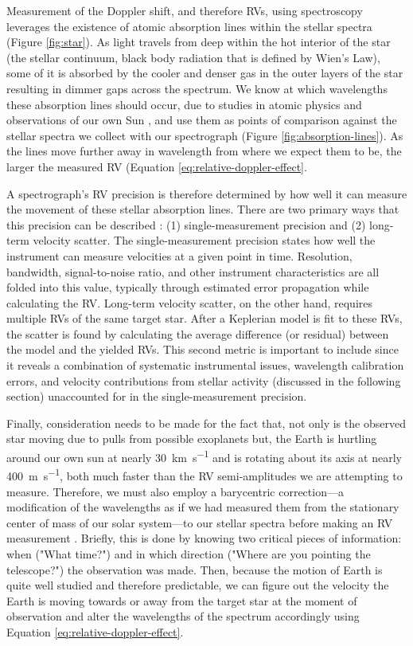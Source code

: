 Measurement of the Doppler shift, and therefore RVs, using spectroscopy leverages the existence of atomic absorption lines within the stellar spectra (Figure \ref{fig:star}). As light travels from deep within the hot interior of the star (the stellar continuum, black body radiation that is defined by Wien's Law), some of it is absorbed by the cooler and denser gas in the outer layers of the star resulting in dimmer gaps across the spectrum. We know at which wavelengths these absorption lines should occur, due to studies in atomic physics \citep[e.g.][]{rydberg_xxxiv_1890} and observations of our own Sun \citep[e.g.][]{fraunhofer_bestimmung_1817}, and use them as points of comparison against the stellar spectra we collect with our spectrograph (Figure \ref{fig:absorption-lines}). As the lines move further away in wavelength from where we expect them to be, the larger the measured RV (Equation \ref{eq:relative-doppler-effect}.

A spectrograph's RV precision is therefore determined by how well it can measure the movement of these stellar absorption lines. There are two primary ways that this precision can be described \citep{fischer_state_2016}: (1) single-measurement precision and (2) long-term velocity scatter. The single-measurement precision states how well the instrument can measure velocities at a given point in time. Resolution, bandwidth, signal-to-noise ratio, and other instrument characteristics are all folded into this value, typically through estimated error propagation while calculating the RV. Long-term velocity scatter, on the other hand, requires multiple RVs of the same target star. After a Keplerian model is fit to these RVs, the scatter is found by calculating the average difference (or residual) between the model and the yielded RVs. This second metric is important to include since it reveals a combination of systematic instrumental issues, wavelength calibration errors, and velocity contributions from stellar activity (discussed in the following section) unaccounted for in the single-measurement precision.

Finally, consideration needs to be made for the fact that, not only is the observed star moving due to pulls from possible exoplanets but, the Earth is hurtling around our own sun at nearly 30~\si{\kilo\meter\per\second} and is rotating about its axis at nearly 400~\si{\meter\per\second}, both much faster than the RV semi-amplitudes we are attempting to measure. Therefore, we must also employ a barycentric correction---a modification of the wavelengths as if we had measured them from the stationary center of mass of our solar system---to our stellar spectra before making an RV measurement \citep{wright_barycentric_2014, blackman_accounting_2017, blackman_measured_2019}. Briefly, this is done by knowing two critical pieces of information: when ("What time?") and in which direction ("Where are you pointing the telescope?") the observation was made. Then, because the motion of Earth is quite well studied and therefore predictable, we can figure out the velocity the Earth is moving towards or away from the target star at the moment of observation and alter the wavelengths of the spectrum accordingly using Equation \ref{eq:relative-doppler-effect}.

